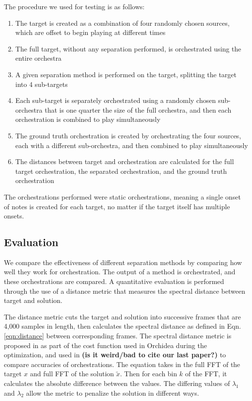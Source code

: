 \documentclass{article}
\begin{document}
		The procedure we used for testing is as follows:
		\begin{enumerate}
			\item The target is created as a combination of four randomly chosen sources, which are offset to begin playing at different times
			\item The full target, without any separation performed, is orchestrated using the entire orchestra
			\item A given separation method is performed on the target, splitting the target into 4 sub-targets
			\item Each sub-target is separately orchestrated using a randomly chosen sub-orchestra that is one quarter the size of the full orchestra, and then each orchestration is combined to play simultaneously
			\item The ground truth orchestration is created by orchestrating the four sources, each with a different sub-orchestra, and then combined to play simultaneously
			\item The distances between target and orchestration are calculated for the full target orchestration, the separated orchestration, and the ground truth orchestration 
		\end{enumerate}	
		
		The orchestrations performed were static orchestrations, meaning a single onset of notes is created for each target, no matter if the target itself has multiple onsets.			
		
		\subsection{Evaluation}
		We compare the effectiveness of different separation methods by comparing how well they work for orchestration. The output of a method is orchestrated, and these orchestrations are compared. A quantitative evaluation is performed through the use of a distance metric that measures the spectral distance between target and solution. 
		
		The distance metric cuts the target and solution into successive frames that are 4,000 samples in length, then calculates the spectral distance as defined in Eqn. \ref{eqn:distance} between corresponding frames. The spectral distance metric is proposed in \cite{Cella2020} as part of the cost function used in Orchidea during the optimization, and used in \cite{Cella2020b} \textbf{(is it weird/bad to cite our last paper?)} to compare accuracies of orchestrations. The equation takes in the full FFT of the target $x$ and full FFT of the solution $\tilde{x}$. Then for each bin $k$ of the FFT, it calculates the absolute difference between the values. The differing values of $\lambda_1$ and $\lambda_2$ allow the metric to penalize the solution in different ways.
		
\end{document}
